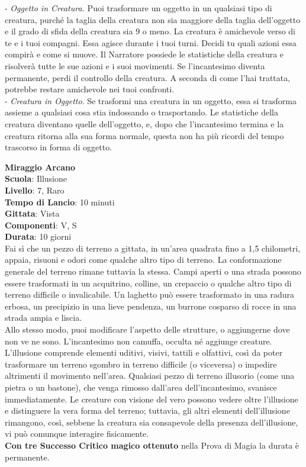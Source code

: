 \begin{multicols}{2}
- \textit{Oggetto in Creatura.} Puoi trasformare un oggetto in un qualsiasi tipo di creatura, purché la taglia della creatura non sia maggiore della taglia dell'oggetto e il grado di sfida della creatura sia 9 o meno. La creatura è amichevole verso di te e i tuoi compagni. Essa agisce durante i tuoi turni. Decidi tu quali azioni essa compirà e come si muove. Il Narratore possiede le statistiche della creatura e risolverà tutte le sue azioni e i suoi movimenti.
Se l'incantesimo diventa permanente, perdi il controllo della creatura. A seconda di come l'hai trattata, potrebbe restare amichevole nei tuoi confronti.\\

- \textit{Creatura in Oggetto}. Se trasformi una creatura in un oggetto, essa si trasforma assieme a qualsiasi cosa stia indossando o trasportando. Le statistiche della creatura diventano quelle dell'oggetto, e, dopo che l'incantesimo termina e la creatura ritorna alla sua forma normale, questa non ha più ricordi del tempo trascorso in forma di oggetto.

\medskip\textbf{Miraggio Arcano}\\
\textbf{Scuola}: Illusione\\
\textbf{Livello}: 7, Raro\\
\textbf{Tempo di Lancio}: 10 minuti\\
\textbf{Gittata}: Vista\\
\textbf{Componenti}: V, S\\
\textbf{Durata}: 10 giorni\\
Fai sì che un pezzo di terreno a gittata, in un'area quadrata fino a 1,5 chilometri, appaia, risuoni e odori come qualche altro tipo di terreno. La conformazione generale del terreno rimane tuttavia la stessa. Campi aperti o una strada possono essere trasformati in un acquitrino, colline, un crepaccio o qualche altro tipo di terreno difficile o invalicabile. Un laghetto può essere trasformato in una radura erbosa, un precipizio in una lieve pendenza, un burrone cosparso di rocce in una strada ampia e liscia.\\
Allo stesso modo, puoi modificare l'aspetto delle strutture, o aggiungerne dove non ve ne sono. L'incantesimo non camuffa, occulta né aggiunge creature.\\
L'illusione comprende elementi uditivi, visivi, tattili e olfattivi, così da poter trasformare un terreno sgombro in terreno difficile (o viceversa) o impedire altrimenti il movimento nell'area. Qualsiasi pezzo di terreno illusorio (come una pietra o un bastone), che venga rimosso dall'area dell'incantesimo, svanisce immediatamente. Le creature con visione del vero possono vedere oltre l'illusione e distinguere la vera forma del terreno; tuttavia, gli altri elementi dell'illusione rimangono, così, sebbene la creatura sia consapevole della presenza dell'illusione, vi può comunque interagire fisicamente.\\
\textbf{Con tre Successo Critico magico ottenuto} nella Prova di Magia la durata è permanente.


\end{multicols}
